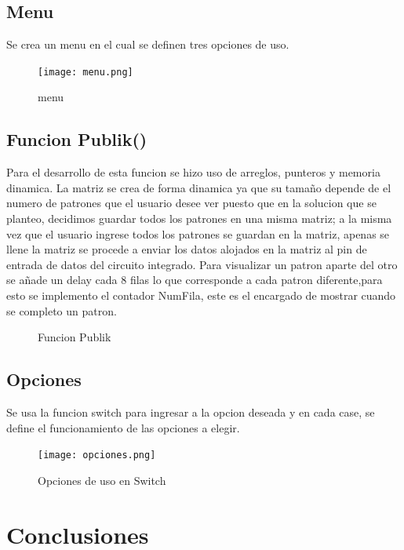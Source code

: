 \documentclass{article}
\begin{document}
\subsection{Menu}
Se crea un menu en el cual se definen tres opciones de uso.
    \begin{figure}[h]
    \texttt{[image: menu.png]}
    \centering
    \caption{menu}
    \label{fig:menu}
    \end{figure}

\subsection{Funcion Publik()}
Para el desarrollo de esta funcion se hizo uso de arreglos, punteros y memoria dinamica. La matriz se crea de forma dinamica ya que su tamaño depende de el numero de patrones que el usuario desee ver puesto que en la solucion que se planteo, decidimos guardar todos los patrones en una misma matriz; a la misma vez que el usuario ingrese todos los patrones se guardan en la matriz, apenas se llene la matriz se procede a enviar los datos alojados en la matriz al pin de entrada de datos del circuito integrado.
Para visualizar un patron aparte del otro se añade un delay cada 8 filas lo que corresponde a cada patron diferente,para esto se implemento el contador NumFila, este es el encargado de mostrar cuando se completo un patron.

\begin{figure}
 \centering
 \caption{Funcion Publik}
 \label{f:Publik}
\end{figure}
    

\subsection{Opciones}
Se usa la funcion switch para ingresar a la opcion deseada y en cada case, se define el funcionamiento de las opciones a elegir.
    \begin{figure}[h]
    \texttt{[image: opciones.png]}
    \centering
    \caption{Opciones de uso en Switch}
    \label{fig:opciones}
    \end{figure}


\section{Conclusiones} 
\label{Algoritmo}





\end{document}
